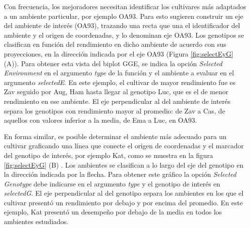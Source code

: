 Con frecuencia, los mejoradores necesitan identificar los cultivares más adaptados a un ambiente particular, por ejemplo OA93. Para esto \citet{YanKang2003} sugieren construir un eje del ambiente de interés (OA93), trazando una recta que una el identificador del ambiente y el origen de coordenadas, y lo denominan eje OA93. Los genotipos se  clasifican en función del rendimiento en dicho ambiente de acuerdo con sus proyecciones, en la dirección indicada por el eje OA93 (Figura \ref{fig:selectEyG} (A)). Para obtener esta vista del biplot GGE, se indica la opción \emph{Selected Environment} en el argumento \emph{type} de la función y el ambiente a evaluar en el argumento  \emph{selectedE}. En este ejemplo, el cultivar de mayor rendimiento fue es Zav seguido por Aug, Ham hasta llegar al genotipo Luc, que es el de menor rendimiento en ese ambiente. El eje perpendicular al del ambiente de interés separa los genotipos con rendimiento mayor al promedio: de Zav a Cas, de aquellos con valores inferior a la media, de Ema a Luc, en OA93.
 
En forma similar, es posible determinar el ambiente más adecuado para un cultivar graficando una línea que conecte el origen de coordenadas y el marcador del genotipo de interés, por ejemplo Kat, como se muestra en la figura \ref{fig:selectEyG} (B) \citep{YanKang2003}. Los ambientes se clasifican a lo largo del eje del genotipo en la dirección indicada por la flecha. Para obtener este gráfico la opción  \emph{Selected Genotype} debe indicarse en el argumento \emph{type} y el genotipo de interés en \emph{selectedG}. El eje perpendicular al del genotipo separa los ambientes en los que el cultivar presentó un rendimiento por debajo y por encima del promedio. En este ejemplo, Kat presentó un desempeño por debajo de la media en todos los ambientes estudiados. \\

